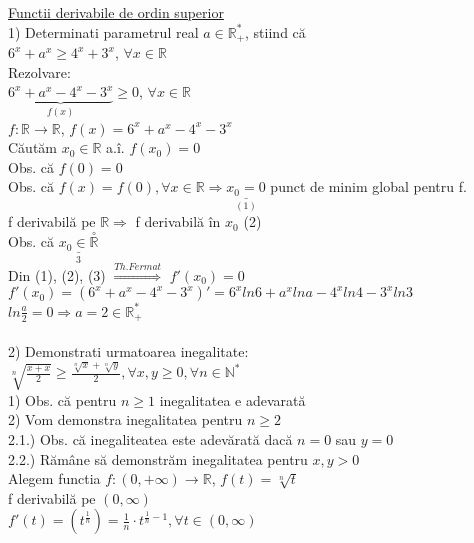 \documentclass[12pt]{extarticle}
\begin{document}
	\huge \underline{Functii derivabile de ordin superior} \\
	{\large
    1) Determinati parametrul real $a \in \mathbb{R}_{+}^{*}$, stiind că \\
    $6^{x} + a^{x} \geq 4^{x} + 3^{x}$, $\forall x \in \mathbb{R}$ \\
    Rezolvare: \\
    $\underset{f(x)}{\underbrace{6^{x} + a^{x} - 4^{x} - 3^{x}}} \geq 0$, $\forall x \in \mathbb{R}$ \\
    $f : \mathbb{R} \to \mathbb{R}$, $f(x) = 6^{x} + a^{x} - 4^{x} - 3^{x}$ \\
    Căutăm $x_{0} \in \mathbb{R}$ a.î. $f(x_{0}) = 0$ \\
    Obs. că $f(0) = 0$ \\
    Obs. că $f(x) = f(0), \forall x \in \mathbb{R} \Rightarrow \underset{(1)}{\underline{x_{0} = 0}}$ punct de minim global pentru f. \\
    f derivabilă pe $\mathbb{R} \Rightarrow$ f derivabilă în $x_{0}$ (2) \\
    Obs. că $\underset{3}{\underline{x_{0} \in \overset{\circ}{\mathbb{R}}}}$ \\
    Din (1), (2), (3) $\overset{Th. Fermat}{\Rightarrow}$ $f'(x_{0}) = 0$ \\
    $f'(x_{0}) = (6^{x} + a^{x} - 4^{x} - 3^{x})' = 6^{x} ln6 + a^{x} lna - 4^{x} ln4 - 3^{x} ln3$ \\
    $ln\frac{a}{2} = 0 \Rightarrow a = 2 \in \mathbb{R}_{+}^{*}$ \\
    \\
    2) Demonstrati urmatoarea inegalitate: \\
    $\sqrt[n]{\frac{x + x}{2}} \geq \frac{\sqrt[n]{x} + \sqrt[n]{y}}{2}, \forall x, y \geq 0, \forall n \in \mathbb{N}^{*}$ \\
    1) Obs. că pentru $n \geq 1$ inegalitatea e adevarată \\
    2) Vom demonstra inegalitatea pentru $n \geq 2$ \\
    2.1.) Obs. că inegaliteatea este adevărată dacă $n = 0$ sau $y = 0$ \\
    2.2.) Rămâne să demonstrăm inegalitatea pentru $x, y > 0$ \\
    Alegem functia $f : (0, +\infty) \to \mathbb{R}$, $f(t) = \sqrt[n]{t}$ \\
    f derivabilă pe $(0, \infty)$ \\
    $f'(t) = (t^{\frac{1}{n}}) = \frac{1}{n} \cdot t^{\frac{1}{n} - 1}, \forall t \in (0, \infty)$ \\
}
\end{document}
